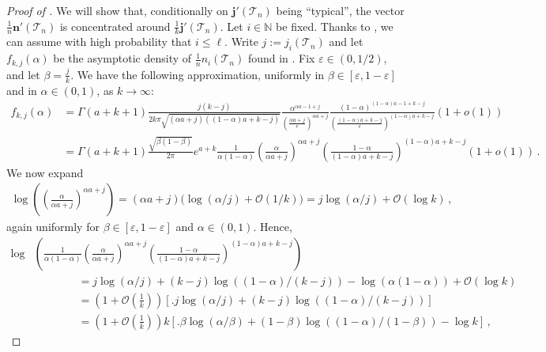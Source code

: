 \documentclass{article}
\theoremstyle{remark}
\newcommand{\bN}{\mathbb{N}}
\newcommand{\cO}{\mathcal{O}}
\newcommand{\cT}{\mathcal{T}}
\newcommand{\bj}{\mathbf{j}}
\newcommand{\bn}{\mathbf{n}}
\begin{document}
\begin{proof}[Proof of ]
We will show that, conditionally on $\bj'(\cT_n)$ being ``typical'', the vector $\frac1n \bn'(\cT_n)$ is concentrated around $\frac{1}{k} \bj'(\cT_n)$.
Let $i\in\bN$ be fixed.
Thanks to , we can assume with high probability that $i \le \ell$.
Write $j := j_i(\cT_n)$ and let $f_{k,j}(\alpha)$ be the asymptotic density of $\frac1n n_i(\cT_n)$ found in .
Fix $\varepsilon \in (0,1/2)$, and let $\beta = \frac{j}{k}$. 
We have the following approximation, uniformly in $\beta \in [\varepsilon, 1-\varepsilon]$ and in $\alpha \in (0,1)$, as $k \rightarrow \infty$:
\begin{align*}
    f_{k,j}(\alpha) &=\Gamma(a+k+1) \frac{j(k-j)}{2k\pi \sqrt{(\alpha a +j)((1-\alpha)a+k-j)}} \frac{\alpha^{\alpha a-1+j}}{\left(\frac{\alpha a +j}{e}\right)^{\alpha a +j}} \frac{(1-\alpha)^{(1-\alpha) a-1+k-j}}{\left(\frac{(1-\alpha) a +k-j}{e}\right)^{(1-\alpha) a +k-j}} (1+o(1))\\
    &=\Gamma(a+k+1)\frac{\sqrt{\beta(1-\beta)}}{2\pi} e^{a+k} \frac{1}{\alpha(1-\alpha)} \left( \frac{\alpha}{\alpha a+j} \right)^{\alpha a + j} \left( \frac{1-\alpha}{(1-\alpha)a+k-j} \right)^{(1-\alpha)a+k-j} (1+o(1)) \,.
\end{align*}
We now expand
\begin{align*}
\log\left(\left( \frac{\alpha}{\alpha a+j} \right)^{\alpha a +j}\right) 
= (\alpha a + j) \big( \log(\alpha/j)+\cO(1/k) \big)
= j \log(\alpha/j) + \cO(\log k) \,,
\end{align*}
again uniformly for $\beta \in [\varepsilon, 1-\varepsilon]$ and $\alpha \in (0,1)$. 
Hence,
\begin{align*}
    \log &\left( \frac{1}{\alpha(1-\alpha)} \left( \frac{\alpha}{\alpha a+j} \right)^{\alpha a + j} \left( \frac{1-\alpha}{(1-\alpha)a+k-j} \right)^{(1-\alpha)a+k-j} \right)
    \\ &\qquad \qquad= j \log(\alpha/j) + (k-j)\log((1-\alpha)/(k-j)) - \log(\alpha(1-\alpha)) + \cO(\log k)
    \\&\qquad \qquad= \left(1+\cO\left(\frac1k\right)\right) \left[\Big. j \log(\alpha/j) + (k-j) \log((1-\alpha)/(k-j)) \right]
    \\&\qquad \qquad= \left(1+\cO\left(\frac1k\right)\right) k \left[\Big. \beta \log(\alpha/\beta)+ (1-\beta) \log((1-\alpha)/(1-\beta)) - \log k \right] \,,
\end{align*}

\end{proof}
\end{document}
